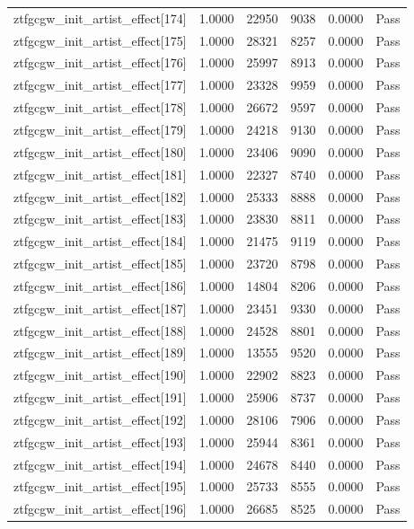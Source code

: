 \begin{table}[htbp]
\begin{tabular}{llrrll}
ztfgcgw\_init\_artist\_effect[174] & 1.0000 & 22950 & 9038 & 0.0000 & Pass \\
ztfgcgw\_init\_artist\_effect[175] & 1.0000 & 28321 & 8257 & 0.0000 & Pass \\
ztfgcgw\_init\_artist\_effect[176] & 1.0000 & 25997 & 8913 & 0.0000 & Pass \\
ztfgcgw\_init\_artist\_effect[177] & 1.0000 & 23328 & 9959 & 0.0000 & Pass \\
ztfgcgw\_init\_artist\_effect[178] & 1.0000 & 26672 & 9597 & 0.0000 & Pass \\
ztfgcgw\_init\_artist\_effect[179] & 1.0000 & 24218 & 9130 & 0.0000 & Pass \\
ztfgcgw\_init\_artist\_effect[180] & 1.0000 & 23406 & 9090 & 0.0000 & Pass \\
ztfgcgw\_init\_artist\_effect[181] & 1.0000 & 22327 & 8740 & 0.0000 & Pass \\
ztfgcgw\_init\_artist\_effect[182] & 1.0000 & 25333 & 8888 & 0.0000 & Pass \\
ztfgcgw\_init\_artist\_effect[183] & 1.0000 & 23830 & 8811 & 0.0000 & Pass \\
ztfgcgw\_init\_artist\_effect[184] & 1.0000 & 21475 & 9119 & 0.0000 & Pass \\
ztfgcgw\_init\_artist\_effect[185] & 1.0000 & 23720 & 8798 & 0.0000 & Pass \\
ztfgcgw\_init\_artist\_effect[186] & 1.0000 & 14804 & 8206 & 0.0000 & Pass \\
ztfgcgw\_init\_artist\_effect[187] & 1.0000 & 23451 & 9330 & 0.0000 & Pass \\
ztfgcgw\_init\_artist\_effect[188] & 1.0000 & 24528 & 8801 & 0.0000 & Pass \\
ztfgcgw\_init\_artist\_effect[189] & 1.0000 & 13555 & 9520 & 0.0000 & Pass \\
ztfgcgw\_init\_artist\_effect[190] & 1.0000 & 22902 & 8823 & 0.0000 & Pass \\
ztfgcgw\_init\_artist\_effect[191] & 1.0000 & 25906 & 8737 & 0.0000 & Pass \\
ztfgcgw\_init\_artist\_effect[192] & 1.0000 & 28106 & 7906 & 0.0000 & Pass \\
ztfgcgw\_init\_artist\_effect[193] & 1.0000 & 25944 & 8361 & 0.0000 & Pass \\
ztfgcgw\_init\_artist\_effect[194] & 1.0000 & 24678 & 8440 & 0.0000 & Pass \\
ztfgcgw\_init\_artist\_effect[195] & 1.0000 & 25733 & 8555 & 0.0000 & Pass \\
ztfgcgw\_init\_artist\_effect[196] & 1.0000 & 26685 & 8525 & 0.0000 & Pass \\

\end{tabular}
\end{table}
